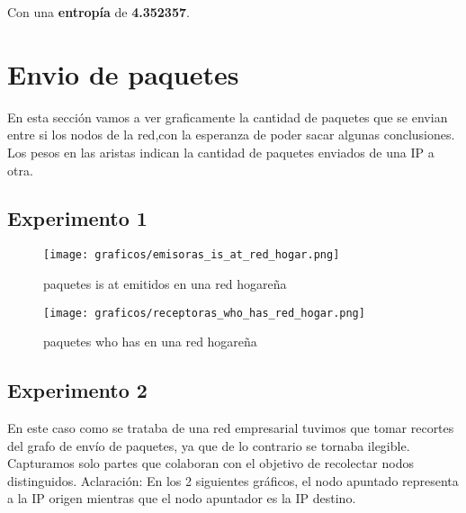 Con una \textbf{entropía} de \textbf{4.352357}.

\section{Envio de paquetes}
En esta sección vamos a ver graficamente la cantidad de paquetes que se envian entre si los nodos de la red,con la esperanza de poder 
sacar algunas conclusiones. Los pesos en las aristas indican la cantidad de paquetes enviados de una IP a otra.

\subsection{Experimento 1}


\begin{figure}[H]
	\centering
	\texttt{[image: graficos/emisoras\_is\_at\_red\_hogar.png]}
	\caption{paquetes is at emitidos en una red hogareña}
      \label{emisorasisat}
\end{figure}




\begin{figure}[H]
	\centering
	\texttt{[image: graficos/receptoras\_who\_has\_red\_hogar.png]}
	\caption{paquetes who has en una red hogareña}
	\label{emisoraswhohas}	
\end{figure}

\newpage


\subsection{Experimento 2}
En este caso como se trataba de una red empresarial tuvimos que tomar recortes del grafo de envío de paquetes, ya que de lo contrario
se tornaba ilegible. Capturamos solo partes que colaboran con el objetivo de recolectar nodos distinguidos. 
Aclaración: En los 2 siguientes gráficos, el nodo apuntado representa a la IP origen mientras que el nodo apuntador es la IP destino.


% 
% 


